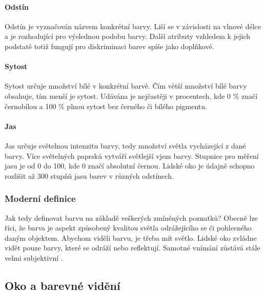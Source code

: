 \paragraph{Odstín}
Odstín je vyznačován názvem konkrétní barvy. Liší se v závislosti na vlnové délce a je rozhodující pro výslednou podobu barvy. Další atributy vzhledem k jejich
podstatě totiž fungují pro diskriminaci barev spíše jako doplňkové.

\paragraph{Sytost}
Sytost určuje množství bílé v konkrétní barvě. Čím větší množství bílé barvy obsahuje, tím menší je sytost. Udávána je nejčastěji v procentech, kde 0 \% značí černobílou a 100 \% 
plnou sytost bez černého či bílého pigmentu.

\paragraph{Jas}
Jas určuje světelnou intenzitu barvy, tedy množství světla vycházející z dané barvy. Více světelných paprsků vytváří světlejší vjem barvy. Stupnice pro měření jasu je od 0 do 100, kde 0
značí absolutní černou. Lidské oko je údajně schopno rozlišit až 300 stupňů jasu barev v různých odstínech.


\subsubsection{Moderní definice}
Jak tedy definovat barvu na základě veškerých zmíněných poznatků? Obecně lze říci, že barva je aspekt způsobený kvalitou světla odrážejícího se či pohlceného daným objektem.
Abychom viděli barvu, je třeba mít světlo. Lidské oko zvládne vidět pouze barvy, které se odráží nebo reflektují. Samotné vnímání zůstává stále velmi subjektivní \cite{pantone}.


\subsection{Oko a barevné vidění}

